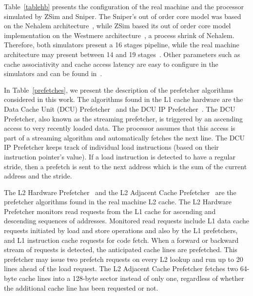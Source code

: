 \documentclass[AMA,final,STIX1COL]{WileyNJD-v2}
\begin{document}
Table~\ref{tablehb}  presents the configuration of the real machine and the processor simulated by ZSim and Sniper. 
The Sniper's out of order core model was based on the Nehalem architecture~\cite{carlson2011sniper}, while ZSim based its out of order core model implementation on the Westmere architecture~\cite{sanchez2013zsim}, a process shrink of Nehalem.
Therefore, both simulators present a 16 stages pipeline, while the real machine architecture may present between 14 and 19 stages~\cite{fog2012microarchitecture}.
Other parameters such as cache associativity and cache access latency are easy to configure in the simulators and can be found in~\cite{fog2012microarchitecture,doweck2017skylake}.

In Table~\ref{prefetches}, we present the description of the prefetcher algorithms considered in this work. 
The algorithms found in the L1 cache hardware are the Data Cache Unit (DCU) Prefetcher~\cite{intelmanual} and the DCU IP Prefetcher~\cite{intelmanual}.
The DCU Prefetcher, also known as the streaming prefetcher, is triggered by an ascending access to very recently loaded data. 
The processor assumes that this access is part of a streaming algorithm and automatically fetches the next line.
The DCU IP Prefetcher keeps track of individual load instructions (based on their instruction pointer's value). 
If a load instruction is detected to have a regular stride, then a prefetch is sent to the next address which is the sum of the current address and the stride.

The L2 Hardware Prefetcher~\cite{intelmanual} and the L2 Adjacent Cache Prefetcher~\cite{intelmanual} are the prefetcher algorithms found in the real machine L2 cache.
The L2 Hardware Prefetcher monitors read requests from the L1 cache for ascending and descending sequences of addresses. 
Monitored read requests include L1 data cache requests initiated by load and store operations and also by the L1 prefetchers, and L1 instruction cache requests for code fetch.
When a forward or backward stream of requests is detected, the anticipated cache lines are prefetched.
This prefetcher may issue two prefetch requests on every L2 lookup and run up to 20 lines ahead of the load request. 
The L2 Adjacent Cache Prefetcher fetches two 64-byte cache lines into a 128-byte sector instead of only one, regardless of whether the additional cache line has been requested or not.
\end{document}
